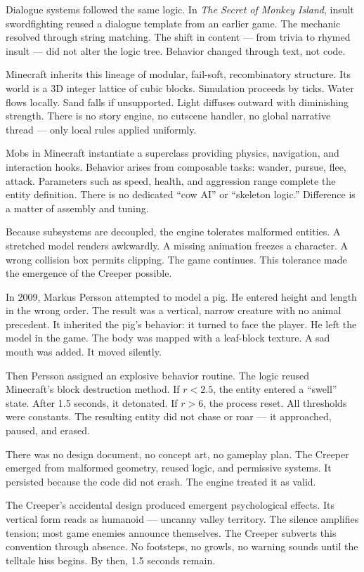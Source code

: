 Dialogue systems followed the same logic. In \emph{The Secret of Monkey Island}, insult swordfighting reused a dialogue template from an earlier game. The mechanic resolved through string matching. The shift in content — from trivia to rhymed insult — did not alter the logic tree. Behavior changed through text, not code.

Minecraft inherits this lineage of modular, fail-soft, recombinatory structure. Its world is a 3D integer lattice of cubic blocks. Simulation proceeds by ticks. Water flows locally. Sand falls if unsupported. Light diffuses outward with diminishing strength. There is no story engine, no cutscene handler, no global narrative thread — only local rules applied uniformly.

Mobs in Minecraft instantiate a superclass providing physics, navigation, and interaction hooks. Behavior arises from composable tasks: wander, pursue, flee, attack. Parameters such as speed, health, and aggression range complete the entity definition. There is no dedicated “cow AI” or “skeleton logic.” Difference is a matter of assembly and tuning.

Because subsystems are decoupled, the engine tolerates malformed entities. A stretched model renders awkwardly. A missing animation freezes a character. A wrong collision box permits clipping. The game continues. This tolerance made the emergence of the Creeper possible.

In 2009, Markus Persson attempted to model a pig. He entered height and length in the wrong order. The result was a vertical, narrow creature with no animal precedent. It inherited the pig’s behavior: it turned to face the player. He left the model in the game. The body was mapped with a leaf-block texture. A sad mouth was added. It moved silently.

Then Persson assigned an explosive behavior routine. The logic reused Minecraft’s block destruction method. If $r < 2.5$, the entity entered a “swell” state. After 1.5 seconds, it detonated. If $r > 6$, the process reset. All thresholds were constants. The resulting entity did not chase or roar — it approached, paused, and erased.

There was no design document, no concept art, no gameplay plan. The Creeper emerged from malformed geometry, reused logic, and permissive systems. It persisted because the code did not crash. The engine treated it as valid.

The Creeper's accidental design produced emergent psychological effects. Its vertical form reads as humanoid — uncanny valley territory. The silence amplifies tension; most game enemies announce themselves. The Creeper subverts this convention through absence. No footsteps, no growls, no warning sounds until the telltale hiss begins. By then, 1.5 seconds remain.


